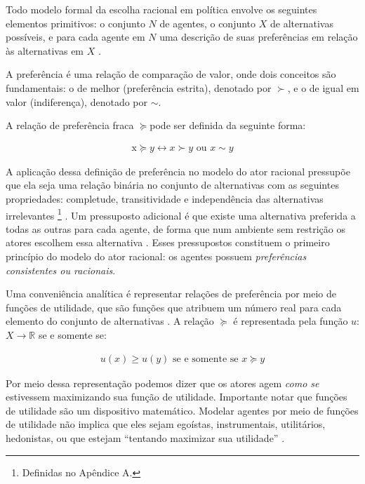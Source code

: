 Todo modelo formal da escolha racional em política envolve os seguintes
elementos primitivos: o conjunto $N$ de agentes, o conjunto \(X\) de
alternativas possíveis, e para cada agente em \(N\) uma descrição de suas
preferências em relação às alternativas em \(X\) \cite[p.
263]{austen1998social}.

A preferência é uma relação de comparação de valor, onde dois conceitos são
fundamentais: o de melhor (preferência estrita), denotado por \(\succ\),  e o de igual
em valor (indiferença), denotado por \(\sim\).

A relação de preferência fraca \( \succeq \)pode ser definida da seguinte forma:

\begin{align*}
  \text{x} \succeq y \leftrightarrow x \succ y \text{ ou } x \sim y
\end{align*}

A aplicação dessa definição de preferência no modelo do ator racional pressupõe
que ela seja uma relação binária no conjunto de alternativas com as seguintes
propriedades: completude, transitividade e independência das alternativas
irrelevantes \footnote{Definidas no Apêndice A.} \cite{gintis2016individuality,
  binmore2008rational}. Um pressuposto adicional é que existe uma alternativa
preferida a todas as outras para cada agente, de forma que num ambiente sem
restrição os atores escolhem essa alternativa \cite{gintis2016individuality}.
Esses pressupostos constituem o primeiro princípio do modelo do ator racional:
os agentes possuem \textit{preferências consistentes ou racionais}.

Uma conveniência analítica é representar relações de preferência por meio de
funções de utilidade, que são funções que atribuem um número real para cada
elemento do conjunto de alternativas \cite{sep-preferences}. A relação \( \succeq\) é
representada pela função \(u\): \(X \longrightarrow \mathbb{R}\) se e somente se:

\begin{align*}
  u(x) \geq u(y)
  \text{ se e somente se }
  x \succeq y
\end{align*}

Por meio dessa representação podemos dizer que os atores agem \textit{como se}
estivessem maximizando sua função de utilidade. Importante notar que funções de
utilidade são um dispositivo matemático. Modelar agentes por meio de funções de
utilidade não implica que eles sejam egoístas, instrumentais, utilitários,
hedonistas, ou que estejam ``tentando maximizar sua utilidade''
\cite{gaus2007philosophy}.

